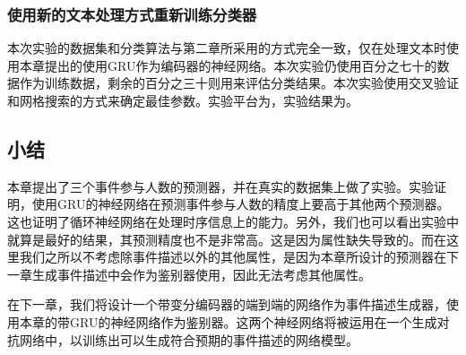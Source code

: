 \documentclass[12pt]{template}
\begin{document}
\subsubsection{使用新的文本处理方式重新训练分类器}
本次实验的数据集和分类算法与第二章所采用的方式完全一致，仅在处理文本时使用本章提出的使用GRU作为编码器的神经网络。本次实验仍使用百分之七十的数据作为训练数据，剩余的百分之三十则用来评估分类结果。本次实验使用交叉验证和网格搜索的方式来确定最佳参数。实验平台为，实验结果为。
\subsection{小结}
本章提出了三个事件参与人数的预测器，并在真实的数据集上做了实验。实验证明，使用GRU的神经网络在预测事件参与人数的精度上要高于其他两个预测器。这也证明了循环神经网络在处理时序信息上的能力。另外，我们也可以看出实验中就算是最好的结果，其预测精度也不是非常高。这是因为属性缺失导致的。而在这里我们之所以不考虑除事件描述以外的其他属性，是因为本章所设计的预测器在下一章生成事件描述中会作为鉴别器使用，因此无法考虑其他属性。

在下一章，我们将设计一个带变分编码器的端到端的网络作为事件描述生成器，使用本章的带GRU的神经网络作为鉴别器。这两个神经网络将被运用在一个生成对抗网络中，以训练出可以生成符合预期的事件描述的网络模型。
\end{document}
